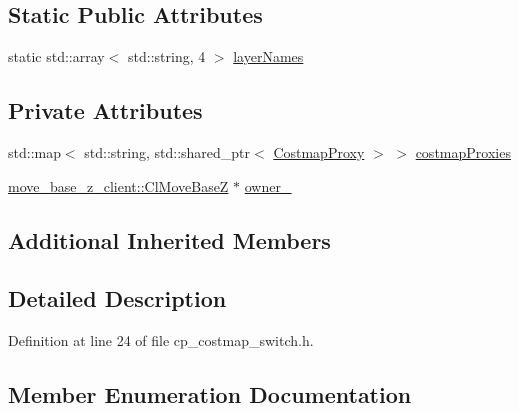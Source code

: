 \subsection*{Static Public Attributes}
\begin{DoxyCompactItemize}
\item 
static std\+::array$<$ std\+::string, 4 $>$ \hyperlink{classmove__base__z__client_1_1CostmapSwitch_adf295965004c939144db60ef353ad89e}{layer\+Names}
\end{DoxyCompactItemize}
\subsection*{Private Attributes}
\begin{DoxyCompactItemize}
\item 
std\+::map$<$ std\+::string, std\+::shared\+\_\+ptr$<$ \hyperlink{classmove__base__z__client_1_1CostmapProxy}{Costmap\+Proxy} $>$ $>$ \hyperlink{classmove__base__z__client_1_1CostmapSwitch_ab9b33bc5774b41e5898718ffdcfcbc25}{costmap\+Proxies}
\item 
\hyperlink{classmove__base__z__client_1_1ClMoveBaseZ}{move\+\_\+base\+\_\+z\+\_\+client\+::\+Cl\+Move\+BaseZ} $\ast$ \hyperlink{classmove__base__z__client_1_1CostmapSwitch_a00517c28045327007d7b9335c9b433ed}{owner\+\_\+}
\end{DoxyCompactItemize}
\subsection*{Additional Inherited Members}


\subsection{Detailed Description}


Definition at line 24 of file cp\+\_\+costmap\+\_\+switch.\+h.



\subsection{Member Enumeration Documentation}
